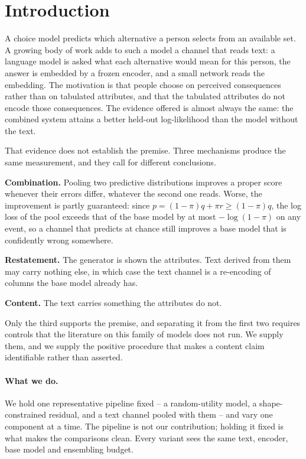 \section{Introduction}

A choice model predicts which alternative a person selects from an available set. A growing
body of work adds to such a model a channel that reads text: a language model is asked what
each alternative would mean for this person, the answer is embedded by a frozen encoder, and
a small network reads the embedding. The motivation is that people choose on perceived
consequences rather than on tabulated attributes, and that the tabulated attributes do not
encode those consequences. The evidence offered is almost always the same: the combined
system attains a better held-out log-likelihood than the model without the text.

That evidence does not establish the premise. Three mechanisms produce the same measurement,
and they call for different conclusions.

\textbf{Combination.} Pooling two predictive distributions improves a proper score whenever
their errors differ, whatever the second one reads. Worse, the improvement is partly
guaranteed: since $p = (1-\pi) q + \pi r \geq (1-\pi) q$, the log loss of the pool exceeds
that of the base model by at most $-\log(1-\pi)$ on any event, so a channel that predicts at
chance still improves a base model that is confidently wrong somewhere.

\textbf{Restatement.} The generator is shown the attributes. Text derived from them may
carry nothing else, in which case the text channel is a re-encoding of columns the base model
already has.

\textbf{Content.} The text carries something the attributes do not.

Only the third supports the premise, and separating it from the first two requires controls
that the literature on this family of models does not run. We supply them, and we supply the
positive procedure that makes a content claim identifiable rather than asserted.

\paragraph{What we do.} We hold one representative pipeline fixed -- a random-utility model, a
shape-constrained residual, and a text channel pooled with them -- and vary one component at a
time. The pipeline is not our contribution; holding it fixed is what makes the comparisons
clean. Every variant sees the same text, encoder, base model and ensembling budget.

